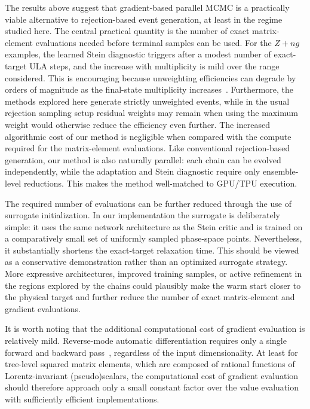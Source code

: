 \documentclass[11pt]{article}
\begin{document}
The results above suggest that gradient-based parallel MCMC is a practically viable alternative to rejection-based event generation, at least in the regime studied here.
The central practical quantity is the number of exact matrix-element evaluations needed before terminal samples can be used.
For the $Z+n g$ examples, the learned Stein diagnostic triggers after a modest number of exact-target ULA steps, and the increase with multiplicity is mild over the range considered.
This is encouraging because unweighting efficiencies can degrade by orders of magnitude as the final-state multiplicity increases~\cite{Danziger:2021eeg,Janssen:2023ahv}. 
Furthermore, the methods explored here generate strictly unweighted events, while in the usual rejection sampling setup residual weights may remain when using the maximum weight would otherwise reduce the efficiency even further.
The increased algorithmic cost of our method is negligible when compared with the compute required for the matrix-element evaluations.
Like conventional rejection-based generation, our method is also naturally parallel: each chain can be evolved independently, while the adaptation and Stein diagnostic require only ensemble-level reductions.
This makes the method well-matched to GPU/TPU execution.

The required number of evaluations can be further reduced through the use of surrogate initialization.
In our implementation the surrogate is deliberately simple: it uses the same network architecture as the Stein critic and is trained on a comparatively small set of uniformly sampled phase-space points.
Nevertheless, it substantially shortens the exact-target relaxation time.
This should be viewed as a conservative demonstration rather than an optimized surrogate strategy.
More expressive architectures, improved training samples, or active refinement in the regions explored by the chains could plausibly make the warm start closer to the physical target and further reduce the number of exact matrix-element and gradient evaluations.

It is worth noting that the additional computational cost of gradient evaluation is relatively mild.
Reverse-mode automatic differentiation requires only a single forward and backward pass~\cite{baur1983complexity,griewank2012invented}, regardless of the input dimensionality.
At least for tree-level squared matrix elements, which are composed of rational functions of Lorentz-invariant (pseudo)scalars, the computational cost of gradient evaluation should therefore approach only a small constant factor over the value evaluation with sufficiently efficient implementations.
\end{document}
